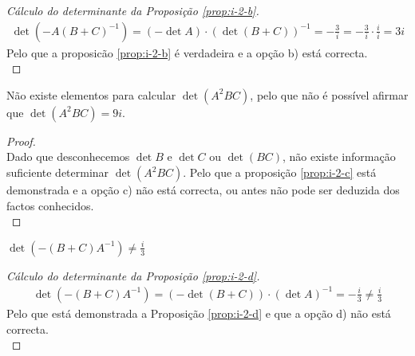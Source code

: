 \vspace{0.25cm}

\begin{proof}[Cálculo do determinante da Proposição \ref{prop:i-2-b}]
	\begin{align*}
		\det(-A(B + C)^{-1})
			   = (- \det A)  \cdot (\det(B + C))^{-1}
			   = -\frac{3}{i}
			   = -\frac{3}{i} \cdot \frac{i}{i}
			   = 3i
	\end{align*}
	Pelo que a proposicão \ref{prop:i-2-b} é verdadeira e a opção b) está correcta.\\
\end{proof}


\begin{proposition}\label{prop:i-2-c}
	Não existe elementos para calcular $\det(A^2 BC)$, pelo que não é
	possível afirmar que $\det(A^2 BC) = 9i$.
\end{proposition}

\vspace{0.25cm}

\begin{proof}
	\; \\
	Dado que desconhecemos $\det B$ e $\det C$ ou  $\det(BC)$, não existe informação
	suficiente determinar $\det(A^2BC)$.
	Pelo que a proposição \ref{prop:i-2-c} está demonstrada e a opção c) não
	está correcta, ou antes não pode ser deduzida dos
	factos conhecidos.\\
\end{proof}

\begin{proposition}\label{prop:i-2-d}
	$\det(-(B + C)A^{-1}) \neq \frac{i}{3}$
\end{proposition}

\vspace{0.25cm}

\begin{proof}[Cálculo do determinante da Proposição \ref{prop:i-2-d}]
	\begin{align*}
		\det(-(B + C)A^{-1})
			   = (-\det(B + C))  \cdot (\det A)^{-1}
			   = -\frac{i}{3} \neq \frac{i}{3}
	\end{align*}
	Pelo que está demonstrada a Proposição \ref{prop:i-2-d} e que a opção d)
	não está correcta.\\
\end{proof}



